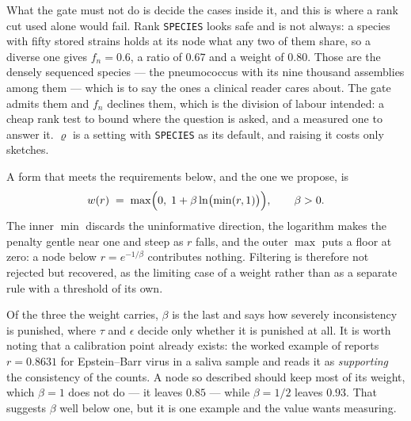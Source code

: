 \documentclass[pdflatex,sn-vancouver-num]{sn-jnl}
\begin{document}
    What the gate must not do is decide the cases inside it, and this is where a rank cut used alone
    would fail. Rank \texttt{SPECIES} looks safe and is not always: a species with fifty stored
    strains holds at its node what any two of them share, so a diverse one gives $f_n = 0.6$, a ratio
    of $0.67$ and a weight of $0.80$. Those are the densely sequenced species --- the pneumococcus
    with its nine thousand assemblies among them --- which is to say the ones a clinical reader cares
    about. The gate admits them and $f_n$ declines them, which is the division of labour intended:
    a cheap rank test to bound where the question is asked, and a measured one to answer it.
    $\varrho$ is a setting with \texttt{SPECIES} as its default, and raising it costs only sketches.

    A form that meets the requirements below, and the one we propose, is
    \begin{equation}\label{smoothyw}
        w(r) \;=\; \max\Bigl( 0, \; 1 + \beta \ln \bigl( \min(r, 1) \bigr) \Bigr),
        \qquad \beta > 0 .
    \end{equation}
    The inner $\min$ discards the uninformative direction, the logarithm makes the penalty gentle near
    one and steep as $r$ falls, and the outer $\max$ puts a floor at zero: a node below
    $r = e^{-1/\beta}$ contributes nothing. Filtering is therefore not rejected but recovered, as
    the limiting case of a weight rather than as a separate rule with a threshold of its own.

    Of the three the weight carries, $\beta$ is the last and says how severely inconsistency is
    punished, where $\tau$ and $\epsilon$ decide only whether it is punished at all. It is worth
    noting that a calibration point already exists: the worked example of \citet{genestrip-pub} reports
    $r = 0.8631$ for Epstein--Barr virus in a saliva sample and reads it as \emph{supporting} the
    consistency of the counts. A node so described should keep most of its weight, which
    $\beta = 1$ does not do --- it leaves $0.85$ --- while $\beta = 1/2$ leaves $0.93$. That
    suggests $\beta$ well below one, but it is one example and the value wants measuring.
\end{document}
